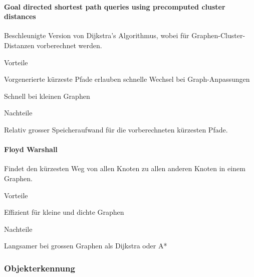 \documentclass[../main.tex]{subfiles}
\begin{document}
\paragraph{Goal directed shortest path queries using precomputed cluster distances}
Beschleunigte Version von Dijkstra's Algorithmus, wobei für Graphen-Cluster-Distanzen vorberechnet werden.

\begin{minipage}[t]{0.48\textwidth}
\begin{items}
  \item [Vorteile]
  \item Vorgenerierte kürzeste Pfade erlauben schnelle Wechsel bei Graph-Anpassungen
  \item Schnell bei kleinen Graphen
\end{items}
\end{minipage}
\hfill
\begin{minipage}[t]{0.48\textwidth}
\begin{items}
  \item [Nachteile]
  \item Relativ grosser Speicheraufwand für die vorberechneten kürzesten Pfade.
\end{items}
\end{minipage}

\paragraph{Floyd Warshall}
Findet den kürzesten Weg von allen Knoten zu allen anderen Knoten in einem Graphen.

\begin{minipage}[t]{0.48\textwidth}
\begin{items}
  \item [Vorteile]
  \item Effizient für kleine und dichte Graphen
\end{items}
\end{minipage}
\hfill
\begin{minipage}[t]{0.48\textwidth}
\begin{items}
  \item [Nachteile]
  \item Langsamer bei grossen Graphen als Dijkstra oder A* 
\end{items}
\end{minipage}

\subsubsection{Objekterkennung}
\end{document}
